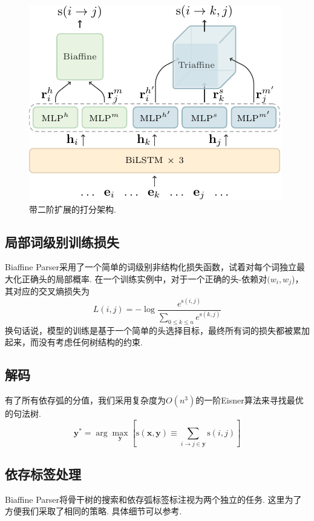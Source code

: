 \begin{figure}[tb]
    \centering
    \includegraphics[scale=1.5]{figures/dep-framework.pdf}
    \caption{带二阶扩展的打分架构.}
    \label{fig:dep-framework}
\end{figure}

\subsection{局部词级别训练损失}
Biaffine Parser采用了一个简单的词级别非结构化损失函数，试着对每个词独立最大化正确头的局部概率.
在一个训练实例中，对于一个正确的头-依赖对$(w_i, w_j$)，其对应的交叉熵损失为
\begin{equation} \label{eq:biaffine-loss}
    \mathit{L}(i,j) = -\log{\frac{e^{\mathrm{s}(i,j)}}{\sum_{0 \le k \le n} e^{\mathrm{s}(k,j)}}}
\end{equation}
换句话说，模型的训练是基于一个简单的头选择目标，最终所有词的损失都被累加起来，而没有考虑任何树结构的约束.

\subsection{解码}
有了所有依存弧的分值，我们采用复杂度为$O(n^3)$的一阶Eisner算法来寻找最优的句法树.
\begin{equation}
    \label{eq:map-decoding}
    {\boldsymbol{y}}^* = \arg\max_{\boldsymbol{y}} \left[ \mathrm{s}(\boldsymbol{x},\boldsymbol{y}) \equiv
        \sum_{i \rightarrow j \in \boldsymbol{y}}{\mathrm{s}(i,j)} \right]
\end{equation}

\subsection{依存标签处理}
Biaffine Parser将骨干树的搜索和依存弧标签标注视为两个独立的任务.
这里为了方便我们采取了相同的策略. 具体细节可以参考\cite{dozat-etal-2017-biaffine}.

